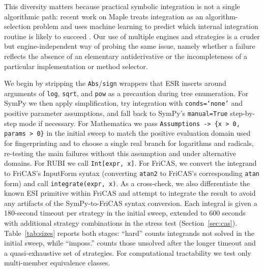 \documentclass[preprint,12pt,authoryear]{elsarticle}
\newcommand{\codexadd}[1]{{\color{purple}#1}}
\newcommand{\hd}[1]{{\color{red}\textbf{[HD: #1]}}}
\begin{document}
\codexadd{This diversity matters because practical symbolic integration is not a single algorithmic path: recent work on Maple treats integration as an algorithm-selection problem and uses machine learning to predict which internal integration routine is likely to succeed \citep{BarketEG2024Selection}. Our use of multiple engines and strategies is a cruder but engine-independent way of probing the same issue, namely whether a failure reflects the absence of an elementary antiderivative or the incompleteness of a particular implementation or method selector.}

We begin by stripping the \texttt{Abs}/\texttt{sign} wrappers that ESR inserts around arguments of \texttt{log}, \texttt{sqrt}, and \texttt{pow} as a precaution during tree enumeration. For SymPy we then apply simplification, try integration with \texttt{conds=`none'} and positive parameter assumptions, and fall back to SymPy's \texttt{manual=True} step-by-step mode if necessary. \codexadd{For Mathematica we pass \texttt{Assumptions -> \{x > 0, params > 0\}} in the initial sweep to match the positive evaluation domain used for fingerprinting and to choose a single real branch for logarithms and radicals, re-testing the main failures without this assumption and under alternative domains.} For RUBI we call \texttt{Int[expr, x]}. For FriCAS, we convert the integrand to FriCAS's InputForm syntax (converting \texttt{atan2} to FriCAS's corresponding \texttt{atan} form) and call \texttt{integrate(expr, x)}. As a cross-check, we also differentiate the known ESI primitive within FriCAS and attempt to integrate the result to avoid any artifacts of the SymPy-to-FriCAS syntax conversion.
Each integral is given a 180-second timeout per strategy in the initial sweep, extended to 600 seconds with additional strategy combinations in the stress test (Section~\ref{sec:cas}). Table~\ref{tab:sizes} reports both stages: ``hard'' counts integrands not solved in the initial sweep, while ``imposs.'' counts those unsolved after the longer timeout and a quasi-exhaustive set of strategies. For computational tractability we test only multi-member equivalence classes.
\end{document}
